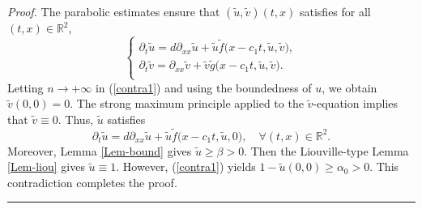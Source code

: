 \documentclass[10pt,a4paper]{amsart}
\newcommand{\R}{\mathbb{R}}
\renewcommand{\eqref}[1]{(\ref{#1})}
\newenvironment{proof}[1][Proof]{\noindent\textit{#1.} }{\hfill \rule{0.5em}{0.5em}}
\begin{document}
\begin{proof}
The parabolic estimates ensure that    $(\tilde{u}, \tilde{v}) (t,x)$  satisfies  for all $(t,x) \in \R^2$,
\begin{equation*}
\begin{cases}
\partial_t \tilde{u}= d \partial_{xx} \tilde{u}  +  \tilde{u}  \tilde{f} \big( x-c_1t, \tilde{u}, \tilde{v} \big),\\
\partial_t \tilde{v}=  \partial_{xx} \tilde{v} + \tilde{v} \tilde{g} \big( x-c_1t, \tilde{u}, \tilde{v} \big).  \\
\end{cases}
\end{equation*}
Letting $n \to +\infty $ in  \eqref{contra1} and using the boundedness of $u$,  we  obtain
$\tilde{v}(0, 0) = 0$. The  strong maximum principle   applied to  the $\tilde{v}$-equation  implies that $\tilde{v}\equiv 0$.  Thus, $\tilde{u}$ satisfies 
\begin{equation*}
\partial_t \tilde{u}= d \partial_{xx} \tilde{u}  + \tilde{u} \tilde{f} \big( x-c_1t, \tilde{u}, 0 \big) ,     \quad \forall (t,x ) \in \R^2.
\end{equation*}
Moreover,  Lemma \ref{Lem-bound} gives $\tilde{u} \geq \beta >0$.   
Then  the Liouville-type  Lemma \ref{Lem-liou}  gives  $\tilde{u} \equiv 1$.     However, \eqref{contra1} yields 
$1- \tilde{u}(0, 0) \geq \alpha_0 >0$.
This contradiction completes  the proof. 


\end{proof}
\end{document}
